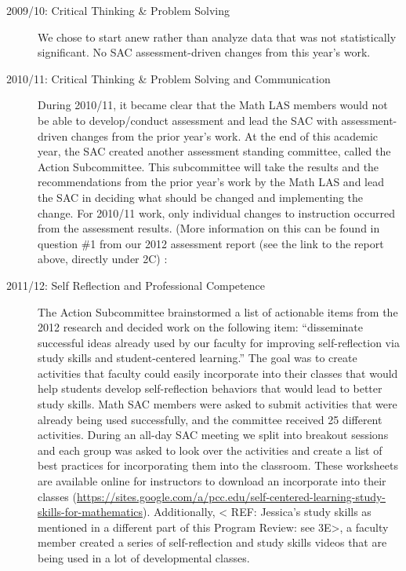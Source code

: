 \begin{description}
\item[2009/10: Critical Thinking \& Problem Solving]

We chose to start anew rather than analyze data that was not statistically significant.  No SAC assessment-driven changes from this year's work.

\item[2010/11:  Critical Thinking \& Problem Solving and Communication]

During 2010/11, it became clear that the Math LAS members would not be able to develop/conduct assessment and lead the SAC with assessment-driven changes from the prior year's work.  At the end of this academic year, the SAC created another assessment standing committee, called the Action Subcommittee.  This subcommittee will take the results and the recommendations from the prior year's work by the Math LAS and lead the SAC in deciding what should be changed and implementing the change.  For 2010/11 work, only individual changes to instruction occurred from the assessment results.  (More information on this can be found in question \#1 from our 2012 assessment report (see the link to the report above, directly under 2C) : 

\item[2011/12: Self Reflection and Professional Competence]

The Action Subcommittee brainstormed a list of actionable items from the 2012 research and decided work on the following item: ``disseminate successful ideas already used by our faculty for improving self-reflection via study skills and student-centered learning.''  The goal was to create activities that faculty could easily incorporate into their classes that would help students develop self-reflection behaviors that would lead to better study skills.  Math SAC members were asked to submit activities that were already being used successfully, and the committee received 25 different activities.  During an all-day SAC meeting we split into breakout sessions and each group was asked to look over the activities and create a list of best practices for incorporating them into the classroom. These worksheets are available online for instructors to download an incorporate into their classes (\url{https://sites.google.com/a/pcc.edu/self-centered-learning-study-skills-for-mathematics}).  Additionally, < REF: Jessica's study skills as mentioned in a different part of this Program Review: see 3E>, a faculty member created a series of self-reflection and study skills videos that are being used in a lot of developmental classes.


\end{description}
